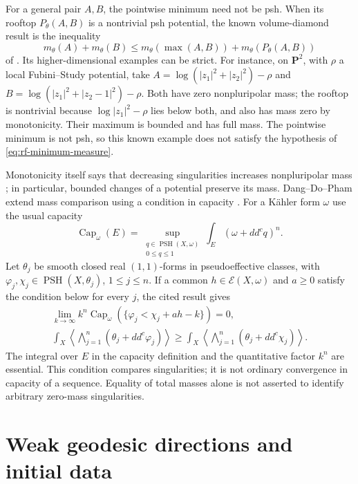For a general pair $A,B$, the pointwise minimum need not be psh.
When its rooftop $P_\theta(A,B)$ is a nontrivial psh potential,
the known volume-diamond result is the inequality
\[
\tag{65.58}\label{eq:rf-rooftop-mass-inequality}
 m_\theta(A)+m_\theta(B)
 \leq m_\theta(\max(A,B))+m_\theta(P_\theta(A,B))
\]
of \cite{DDNLmetric}. Its higher-dimensional examples can be
strict. For instance, on $\mathbf P^2$, with $\rho$ a local
Fubini--Study potential, take
$A=\log(|z_1|^2+|z_2|^2)-\rho$ and
$B=\log(|z_1|^2+|z_2-1|^2)-\rho$.
Both have zero nonpluripolar mass; the rooftop is nontrivial
because $\log|z_1|^2-\rho$ lies below both, and also has
mass zero by monotonicity. Their maximum is bounded and
has full mass. The pointwise minimum is not psh, so this
known example does not satisfy the hypothesis of
\eqref{eq:rf-minimum-measure}.

Monotonicity itself says that decreasing singularities increases
nonpluripolar mass \cite{WN19}; in particular, bounded changes
of a potential preserve its mass. Dang--Do--Pham extend mass
comparison using a condition in capacity
\cite[Theorem~1.2]{DDP25MassPreprint}.
For a K\"ahler form $\omega$ use the usual capacity
\[
 \operatorname{Cap}_\omega(E)
 =\sup_{\substack{q\in\operatorname{PSH}(X,\omega)\\0\leq q\leq1}}
       \int_E(\omega+dd^cq)^n.
\]
Let $\theta_j$ be smooth closed real $(1,1)$-forms in
pseudoeffective classes, with
$\varphi_j,\chi_j\in\operatorname{PSH}(X,\theta_j)$,
$1\leq j\leq n$. If a common $h\in\mathcal E(X,\omega)$
and $a\geq0$ satisfy the condition below for every $j$, the
cited result gives
\[
\tag{65.59}\label{eq:rf-mass-capacity-comparison}
 \begin{gathered}
 \lim_{k\to\infty}k^n\operatorname{Cap}_\omega
       (\{\varphi_j<\chi_j+ah-k\})=0,\\
 \int_X\left\langle\bigwedge_{j=1}^n
                 (\theta_j+dd^c\varphi_j)\right\rangle
 \geq
 \int_X\left\langle\bigwedge_{j=1}^n
                 (\theta_j+dd^c\chi_j)\right\rangle.
 \end{gathered}
\]
The integral over $E$ in the capacity definition and the
quantitative factor $k^n$ are essential. This condition compares
singularities; it is not ordinary convergence in capacity of a
sequence. Equality of total masses alone is not asserted to
identify arbitrary zero-mass singularities.

\clearpage

\section{Weak geodesic directions and initial data}
\label{sec:rf-survey-initial-data}

